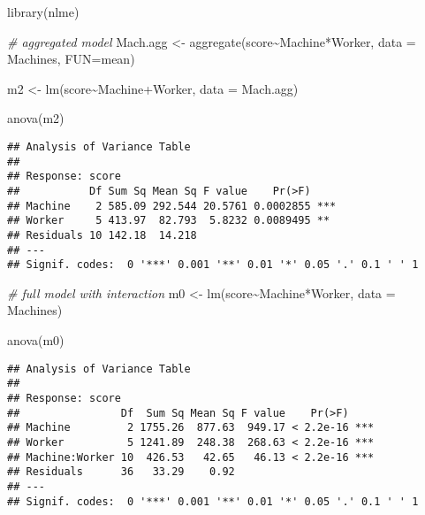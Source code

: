 \documentclass[
]{book}
\newenvironment{Shaded}{\begin{snugshade}}{\end{snugshade}}
\newcommand{\AttributeTok}[1]{\textcolor[rgb]{0.77,0.63,0.00}{#1}}
\newcommand{\CommentTok}[1]{\textcolor[rgb]{0.56,0.35,0.01}{\textit{#1}}}
\newcommand{\FunctionTok}[1]{\textcolor[rgb]{0.00,0.00,0.00}{#1}}
\newcommand{\NormalTok}[1]{#1}
\newcommand{\OtherTok}[1]{\textcolor[rgb]{0.56,0.35,0.01}{#1}}
\newcommand{\SpecialCharTok}[1]{\textcolor[rgb]{0.00,0.00,0.00}{#1}}
\begin{document}
\begin{Shaded}
\begin{Highlighting}[]
\FunctionTok{library}\NormalTok{(nlme)}

\CommentTok{\# aggregated model}
\NormalTok{Mach.agg }\OtherTok{\textless{}{-}} \FunctionTok{aggregate}\NormalTok{(score}\SpecialCharTok{\textasciitilde{}}\NormalTok{Machine}\SpecialCharTok{*}\NormalTok{Worker, }\AttributeTok{data =}\NormalTok{ Machines, }\AttributeTok{FUN=}\NormalTok{mean)}

\NormalTok{m2 }\OtherTok{\textless{}{-}} \FunctionTok{lm}\NormalTok{(score}\SpecialCharTok{\textasciitilde{}}\NormalTok{Machine}\SpecialCharTok{+}\NormalTok{Worker, }\AttributeTok{data =}\NormalTok{ Mach.agg)}

\FunctionTok{anova}\NormalTok{(m2)}
\end{Highlighting}
\end{Shaded}

\begin{verbatim}
## Analysis of Variance Table
## 
## Response: score
##           Df Sum Sq Mean Sq F value    Pr(>F)    
## Machine    2 585.09 292.544 20.5761 0.0002855 ***
## Worker     5 413.97  82.793  5.8232 0.0089495 ** 
## Residuals 10 142.18  14.218                      
## ---
## Signif. codes:  0 '***' 0.001 '**' 0.01 '*' 0.05 '.' 0.1 ' ' 1
\end{verbatim}

\begin{Shaded}
\begin{Highlighting}[]
\CommentTok{\# full model with interaction}
\NormalTok{m0 }\OtherTok{\textless{}{-}} \FunctionTok{lm}\NormalTok{(score}\SpecialCharTok{\textasciitilde{}}\NormalTok{Machine}\SpecialCharTok{*}\NormalTok{Worker, }\AttributeTok{data =}\NormalTok{ Machines)}

\FunctionTok{anova}\NormalTok{(m0)}
\end{Highlighting}
\end{Shaded}

\begin{verbatim}
## Analysis of Variance Table
## 
## Response: score
##                Df  Sum Sq Mean Sq F value    Pr(>F)    
## Machine         2 1755.26  877.63  949.17 < 2.2e-16 ***
## Worker          5 1241.89  248.38  268.63 < 2.2e-16 ***
## Machine:Worker 10  426.53   42.65   46.13 < 2.2e-16 ***
## Residuals      36   33.29    0.92                      
## ---
## Signif. codes:  0 '***' 0.001 '**' 0.01 '*' 0.05 '.' 0.1 ' ' 1
\end{verbatim}
\end{document}
